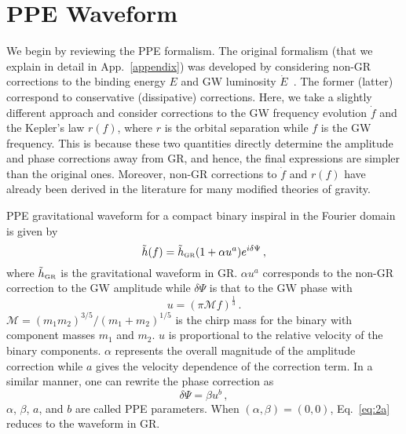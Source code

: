 \documentclass[prd,twocolumn,nofootinbib]{revtex4-1}
\newcommand{\GR}{{\mbox{\tiny GR}}}
\begin{document}
\section{PPE Waveform}\label{section:ppE}
We begin by reviewing the PPE formalism. The original formalism (that we explain in detail in App.~\ref{appendix}) was developed by considering non-GR corrections to the binding energy $E$ and GW luminosity $\dot E$~\cite{Yunes:2009ke,Chatziioannou:2012rf}. The former (latter) correspond to conservative (dissipative) corrections. Here, we take a slightly different approach and consider corrections to the GW frequency evolution $\dot f$ and the Kepler's law $r(f)$, where $r$ is the orbital separation while $f$ is the GW frequency. This is because these two quantities directly determine the amplitude and phase corrections away from GR, and hence, the final expressions are simpler than the original ones. Moreover, non-GR corrections to $\dot f$ and $r(f)$ have already been derived in the literature for many modified theories of gravity.

PPE gravitational waveform for a compact binary inspiral in the Fourier domain is given by~\cite{Yunes:2009ke}
\begin{equation}\label{eq:2a}
\tilde{h}(f)=\tilde{h}_{\GR}(1+\alpha u^a)e^{i\delta\Psi}\,,
\end{equation}
% 
where $\tilde{h}_{\GR}$ is the gravitational waveform in GR. $\alpha u^a$ corresponds to the non-GR correction to the GW amplitude while  $\delta \Psi$ is that to the GW phase with 
\begin{equation}
u=(\pi \mathcal{M} f)^\frac{1}{3}\,.
\end{equation}
$\mathcal{M}=(m_1m_2)^{3/5}/(m_1+m_2)^{1/5}$ is the chirp mass for the binary with component masses $m_1$ and $m_2$. $u$ is proportional to the relative velocity of the binary components. $\alpha$ represents the overall magnitude of the amplitude correction while $a$ gives the velocity dependence of the correction term. In a similar manner, one can rewrite the phase correction as 
\begin{equation}\label{eq:2b}
\delta\Psi=\beta u^b\,,
\end{equation}
$\alpha$, $\beta$, $a$, and $b$ are called PPE parameters. When $(\alpha,\beta) = (0,0)$, Eq.~\eqref{eq:2a} reduces to the waveform in GR.

\end{document}
